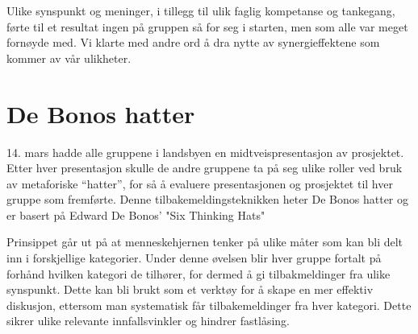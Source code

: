 Ulike synspunkt og meninger, i tillegg til ulik faglig kompetanse og tankegang, førte til et resultat ingen på gruppen så for seg i starten, men som alle var meget fornøyde med. Vi klarte med andre ord å dra nytte av synergieffektene som kommer av vår ulikheter.


\section{De Bonos hatter} %
14. mars hadde alle gruppene i landsbyen en midtveispresentasjon av prosjektet. Etter hver presentasjon skulle de andre gruppene ta på seg ulike roller ved bruk av metaforiske “hatter”, for så å evaluere presentasjonen og prosjektet til hver gruppe som fremførte. Denne tilbakemeldingsteknikken heter De Bonos hatter og er basert på Edward De Bonos' "Six Thinking Hats" \cite{bonos}

Prinsippet går ut på at menneskehjernen tenker på ulike måter som kan bli delt inn i forskjellige kategorier. Under denne øvelsen blir hver gruppe fortalt på forhånd hvilken kategori de tilhører, for dermed å gi tilbakmeldinger fra ulike synspunkt. Dette kan bli brukt som et verktøy for å skape en mer effektiv diskusjon, ettersom man systematisk får tilbakemeldinger fra hver kategori. Dette sikrer ulike relevante innfallsvinkler og hindrer fastlåsing.

